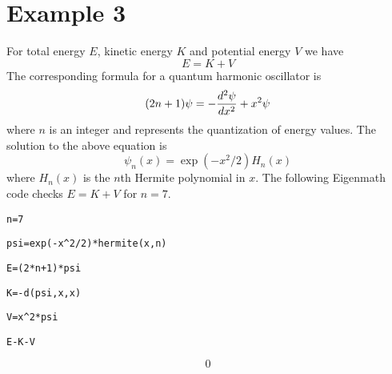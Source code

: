 
\newpage

\section*{Example 3}

For total energy $E$, kinetic energy $K$ and potential energy $V$ we have
$$E=K+V$$
The corresponding formula for a quantum harmonic oscillator is
$$(2n+1)\psi=-{d^2\psi\over dx^2}+x^2\psi$$
where $n$ is an integer and represents the quantization of energy values.
The solution to the above equation is
$$\psi_n(x)=\exp(-x^2/2)H_n(x)$$
where $H_n(x)$ is the $n$th Hermite polynomial in $x$.
The following Eigenmath code checks $E=K+V$ for $n=7$.

\medskip
\verb$n=7$

\verb$psi=exp(-x^2/2)*hermite(x,n)$

\verb$E=(2*n+1)*psi$

\verb$K=-d(psi,x,x)$

\verb$V=x^2*psi$

\verb$E-K-V$

$$0$$

